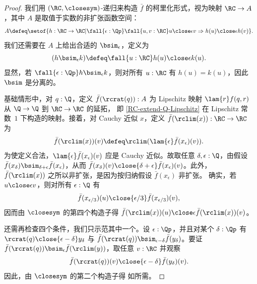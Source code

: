 \begin{proof}
  我们用 $(\RC, {\closesym})$-递归来构造 $\bar{f}$ 的柯里化形式，视为映射
  $\RC \to A$，其中 $A$ 是取值于实数的非扩张函数空间：
  \begin{equation*}
    A \defeq
    \setof{ h : \RC \to \RC |
      \fall{\epsilon : \Qp} \fall{u, v : \RC}
      u \close\epsilon v \Rightarrow h(u) \close\epsilon h(v)
    }.
  \end{equation*}
  我们还需要在 $A$ 上给出合适的 $\bsim_\epsilon$，定义为
  \begin{equation*}
    (h \bsim_\epsilon k) \defeq \fall{u : \RC} h(u) \close\epsilon k(u).
  \end{equation*}
  显然，若 $\fall{\epsilon : \Qp} h \bsim_\epsilon k$，则对所有 $u :
  \RC$ 有 $h(u) = k(u)$，因此 $\bsim$ 是分离的。

  基础情形中，对 $q : \Q$，定义 $\bar{f}(\rcrat(q)) : A$ 为
  Lipschitz 映射 $\lam{r} f(q,r)$ 从 $\Q \to \Q$ 到 $\RC \to \RC$ 的延拓，
  即 \cref{RC-extend-Q-Lipschitz} 在 Lipschitz 常数~$1$ 下构造的映射。接着，对
  Cauchy 近似 $x$，定义 $\bar{f}(\rclim(x)) : \RC \to \RC$ 为
  \begin{equation*}
    \bar{f}(\rclim(x))(v) \defeq \rclim (\lam{\epsilon} \bar{f}(x_\epsilon)(v)).
  \end{equation*}
  为使定义合法，$\lam{\epsilon} \bar{f}(x_\epsilon)(v)$ 应是
  Cauchy 近似。故取任意 $\delta, \epsilon : \Q$，由假设
  $\bar{f}(x_\delta) \bsim_{\delta + \epsilon} \bar{f}(x_\epsilon)$，从而
  $\bar{f}(x_\delta)(v) \close{\delta + \epsilon} \bar{f}(x_\epsilon)(v)$。此外，
  $\bar{f}(\rclim(x))$ 之所以非扩张，是因为按归纳假设 $\bar{f}(x_\epsilon)$ 非扩张。
  确实，若 $u \close\epsilon v$，则对所有 $\epsilon : \Q$ 有
  \begin{equation*}
    \bar{f}(x_{\epsilon/3})(u) \close{\epsilon/3} \bar{f}(x_{\epsilon/3})(v),
  \end{equation*}
  因而由 $\closesym$ 的第四个构造子得 $\bar{f}(\rclim(x))(u) \close\epsilon \bar{f}(\rclim(x))(v)$。

  还需再检查四个条件，我们只示范其中一个。设
  $\epsilon : \Qp$，并且对某个 $\delta : \Qp$ 有 $\rcrat(q) \close{\epsilon - \delta}
  y_\delta$ 与 $\bar{f}(\rcrat(q)) \bsim_{\epsilon - \delta} \bar{f}(y_\delta)$。要证
  $\bar{f}(\rcrat(q)) \bsim_\epsilon \bar{f}(\rclim(y))$，取任意 $v : \RC$ 并观察
  \begin{equation*}
    \bar{f}(\rcrat(q))(v) \close{\epsilon - \delta} \bar{f}(y_\delta)(v).
  \end{equation*}
  因此，由 $\closesym$ 的第二个构造子得
  如所需。
\end{proof}

